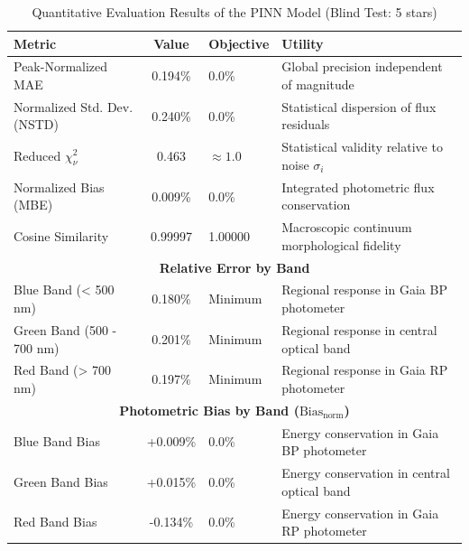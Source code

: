 
\begin{table}[htpb]
\centering
\caption{Quantitative Evaluation Results of the PINN Model (Blind Test: 5 stars)}
\label{tab:pinn_evaluation}
\begin{tabular}{lcll}
\hline
\textbf{Metric} & \textbf{Value} & \textbf{Objective} & \textbf{Utility} \\
\hline
Peak-Normalized MAE & 0.194\% & 0.0\% & Global precision independent of magnitude \\
Normalized Std. Dev. (NSTD) & 0.240\% & 0.0\% & Statistical dispersion of flux residuals \\
Reduced $\chi^2_\nu$ & 0.463 & $\approx 1.0$ & Statistical validity relative to noise $\sigma_i$ \\
Normalized Bias (MBE) & 0.009\% & 0.0\% & Integrated photometric flux conservation \\
Cosine Similarity & 0.99997 & 1.00000 & Macroscopic continuum morphological fidelity \\
\hline
\multicolumn{4}{c}{\textbf{Relative Error by Band}} \\
\hline
Blue Band (< 500 nm) & 0.180\% & Minimum & Regional response in Gaia BP photometer \\
Green Band (500 - 700 nm) & 0.201\% & Minimum & Regional response in central optical band \\
Red Band (> 700 nm) & 0.197\% & Minimum & Regional response in Gaia RP photometer \\
\hline
\multicolumn{4}{c}{\textbf{Photometric Bias by Band ($\text{Bias}_{\text{norm}}$)}} \\
\hline
Blue Band Bias & +0.009\% & 0.0\% & Energy conservation in Gaia BP photometer \\
Green Band Bias & +0.015\% & 0.0\% & Energy conservation in central optical band \\
Red Band Bias & -0.134\% & 0.0\% & Energy conservation in Gaia RP photometer \\
\hline
\end{tabular}
\end{table}
